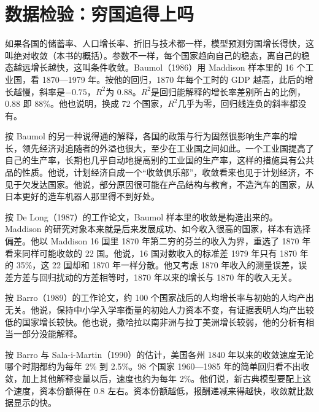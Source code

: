 \section{数据检验：穷国追得上吗}\label{sec:solow-check}

如果各国的储蓄率、人口增长率、折旧与技术都一样，模型预测穷国增长得快，这叫绝对收敛（本书的概括）。参数不一样，每个国家趋向自己的稳态，离自己的稳态越远增长越快，这叫条件收敛。Baumol（1986）用 Maddison 样本里的 16 个工业国，看 1870—1979 年\cite{baumol1986}。按他的回归，1870 年每个工时的 GDP 越高，此后的增长越慢，斜率是$-0.75$，$R^{2}$为 0.88\cite{baumol1986}。$R^{2}$是回归能解释的增长率差别所占的比例，0.88 即 88\%。他也说明，换成 72 个国家，$R^{2}$几乎为零，回归线连负的斜率都没有\cite{baumol1986}。

按 Baumol 的另一种说得通的解释，各国的政策与行为固然很影响生产率的增长，领先经济对追随者的外溢也很大，至少在工业国之间如此\cite{baumol1986}。一个工业国提高了自己的生产率，长期也几乎自动地提高别的工业国的生产率，这样的措施具有公共品的性质\cite{baumol1986}。他说，计划经济自成一个“收敛俱乐部”，收敛看来也见于计划经济，不见于欠发达国家\cite{baumol1986}。他说，部分原因很可能在产品结构与教育，不造汽车的国家，从日本更好的造车机器人那里得不到好处\cite{baumol1986}。

按 De Long（1987）的工作论文，Baumol 样本里的收敛是构造出来的\cite{delong1987}。Maddison 的研究对象本来就是后来发展成功、如今收入很高的国家，样本有选择偏差\cite{delong1987}。他以 Maddison 16 国里 1870 年第二穷的芬兰的收入为界，重选了 1870 年看来同样可能收敛的 22 国\cite{delong1987}。他说，16 国对数收入的标准差 1979 年只有 1870 年的 35\%，这 22 国却和 1870 年一样分散\cite{delong1987}。他又考虑 1870 年收入的测量误差，误差方差与回归扰动的方差相等时，1870 年以来的增长与 1870 年的收入无关\cite{delong1987}。

按 Barro（1989）的工作论文，约 100 个国家战后的人均增长率与初始的人均产出无关\cite{barro1989}。他说，保持中小学入学率衡量的初始人力资本不变，有证据表明人均产出较低的国家增长较快\cite{barro1989}。他也说，撒哈拉以南非洲与拉丁美洲增长较弱，他的分析有相当一部分没能解释\cite{barro1989}。

按 Barro 与 Sala-i-Martin（1990）的估计，美国各州 1840 年以来的收敛速度无论哪个时期都约为每年 2\% 到 2.5\%\cite{bsm1990}。98 个国家 1960—1985 年的简单回归看不出收敛，加上其他解释变量以后，速度也约为每年 2\%\cite{bsm1990}。他们说，新古典模型要配上这个速度，资本份额得在 0.8 左右\cite{bsm1990}。资本份额越低，报酬递减来得越快，收敛就比数据显示的快\cite{bsm1990}。

